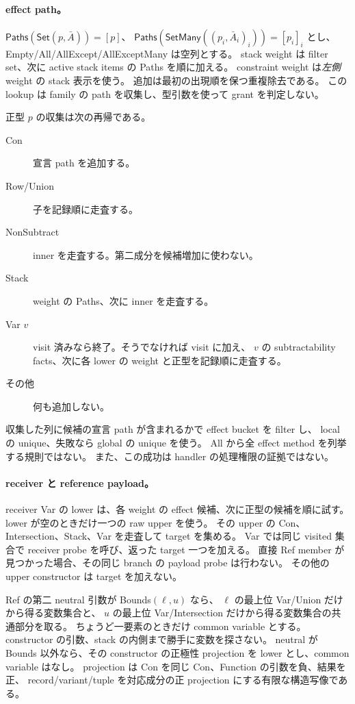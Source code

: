 \documentclass[11pt,a4paper]{article}
\begin{document}
\paragraph{effect path。}
\(\mathsf{Paths}(\mathsf{Set}(p,\bar A))=[p]\)、
\(\mathsf{Paths}(\mathsf{SetMany}((p_i,\bar A_i)_i))=[p_i]_i\) とし、
Empty/All/AllExcept/AllExceptMany は空列とする。
stack weight は filter set、次に active stack items の Paths を順に加える。
constraint weight は\emph{左側} weight の stack 表示を使う。
追加は最初の出現順を保つ重複除去である。
この lookup は family の path を収集し、型引数を使って grant を判定しない。

正型 \(p\) の収集は次の再帰である。
\begin{description}
\item[Con] 宣言 path を追加する。
\item[Row/Union] 子を記録順に走査する。
\item[NonSubtract] inner を走査する。第二成分を候補増加に使わない。
\item[Stack] weight の Paths、次に inner を走査する。
\item[Var \(v\)] visit 済みなら終了。そうでなければ visit に加え、
      \(v\) の subtractability facts、次に各 lower の weight と正型を記録順に走査する。
\item[その他] 何も追加しない。
\end{description}
収集した列に候補の宣言 path が含まれるかで effect bucket を filter し、
local の unique、失敗なら global の unique を使う。
All から全 effect method を列挙する規則ではない。
また、この成功は handler の処理権限の証拠ではない。

\paragraph{receiver と reference payload。}
receiver Var の lower は、各 weight の effect 候補、次に正型の候補を順に試す。
lower が空のときだけ一つの raw upper を使う。
その upper の Con、Intersection、Stack、Var を走査して target を集める。
Var では同じ visited 集合で receiver probe を呼び、返った target 一つを加える。
直接 Ref member が見つかった場合、その同じ branch の payload probe は行わない。
その他の upper constructor は target を加えない。

Ref の第二 neutral 引数が Bounds\((\ell,u)\) なら、
\(\ell\) の最上位 Var/Union だけから得る変数集合と、
\(u\) の最上位 Var/Intersection だけから得る変数集合の共通部分を取る。
ちょうど一要素のときだけ common variable とする。
constructor の引数、stack の内側まで勝手に変数を探さない。
neutral が Bounds 以外なら、その constructor の正極性 projection を lower とし、common variable はなし。
projection は Con を同じ Con、Function の引数を負、結果を正、
record/variant/tuple を対応成分の正 projection にする有限な構造写像である。
\end{document}
